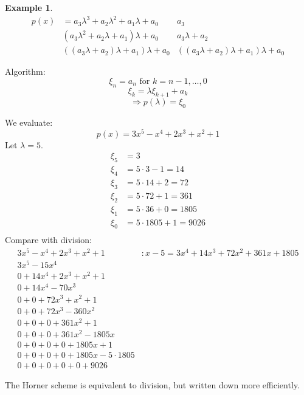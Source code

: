 \documentclass[a4paper,landscape,twocolumn]{article}
\theoremstyle{definition}
\newtheorem{ex}{Example}
\begin{document}
\begin{ex}
  \begin{align*}
    p(x) &= a_3 \lambda^3 + a_2 \lambda^2 + a_1 \lambda + a_0  & a_3 \\
         & (a_3 \lambda^2 + a_2 \lambda + a_1) \lambda + a_0   & a_3 \lambda + a_2 \\
         & ((a_3 \lambda + a_2) \lambda + a_1) \lambda + a_0   & ((a_3 \lambda + a_2) \lambda + a_1) \lambda + a_0
  \end{align*}

  Algorithm:
  \[ \xi_n = a_n \text{ for } k = n-1, \ldots, 0 \]
  \[ \xi_k = \lambda \xi_{k+1} + a_k \]
  \[ \Rightarrow p(\lambda) = \xi_0 \]

  We evaluate:
  \[ p(x) = 3x^5 - x^4 + 2x^3 + x^2 + 1 \]
  Let $\lambda = 5$.
  \begin{align*}
    \xi_5 &= 3 \\
    \xi_4 &= 5 \cdot 3 -1 = 14 \\
    \xi_3 &= 5 \cdot 14 + 2 = 72 \\
    \xi_2 &= 5 \cdot 72 + 1 = 361 \\
    \xi_1 &= 5 \cdot 36 + 0 = 1805 \\
    \xi_0 &= 5 \cdot 1805 + 1 = 9026 \\
  \end{align*}
  Compare with division:
  \[
    \begin{array}{rl}
      3x^5 - x^4 + 2x^3 + x^2 + 1 &: x - 5 = 3x^4 + 14x^3 + 72x^2 + 361x + 1805 \\
      3x^5 - 15x^4 \\
    \hline
      0 + 14x^4 + 2x^3 + x^2 + 1 \\
      0 + 14x^4 - 70x^3 \\
    \hline
      0 + 0     + 72x^3 + x^2 + 1 \\
      0 + 0     + 72x^3 - 360x^2 \\
    \hline
      0 + 0     + 0     + 361x^2 + 1 \\
      0 + 0     + 0     + 361x^2 - 1805x \\
    \hline
      0 + 0     + 0     + 0      + 1805x + 1 \\
      0 + 0     + 0     + 0      + 1805x - 5 \cdot 1805 \\
    \hline
      0 + 0     + 0     + 0      + 0     + 9026
    \end{array}
  \]

  The Horner scheme is equivalent to division, but written down more efficiently.
\end{ex}
\end{document}
